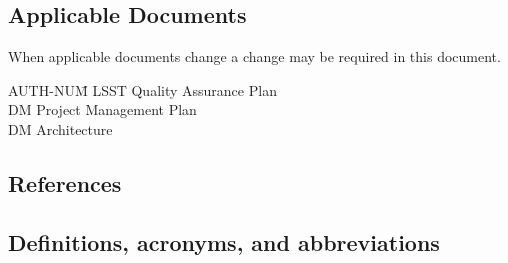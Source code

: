 \subsection{Applicable Documents \label{sect:ad}}
When applicable documents change a change may be required in this document.
\begin{tabbing}
AUTH-NUM\= \kill 
{}\>	LSST Quality  Assurance Plan \\
 \>	DM Project Management Plan   \\
\>	DM Architecture\\
\end{tabbing}

\subsection{References}

\renewcommand{\refname}{}


\subsection{Definitions, acronyms, and abbreviations \label{sect:acronyms}} 





